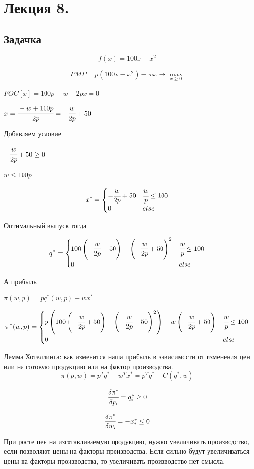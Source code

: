 \documentclass[reqno]{article}
\theoremstyle{definition}
\theoremstyle{definition}
\theoremstyle{definition}
\theoremstyle{definition}
\theoremstyle{definition}
\theoremstyle{definition}
\theoremstyle{definition}
\theoremstyle{definition}
\theoremstyle{definition}
\begin{document}
	\newpage
	
	\section{Лекция 8.}
	
	\subsection{Задачка}
	$$f(x) = 100 x - x^2$$
	
	$$PMP = p(100 x - x^2) - w x \rightarrow \max\limits_{x\geq 0} $$
	
	$FOC[x] = 100p - w - 2 px=0$
	
	$x = \cfrac{-w+100p}{2p} = -\cfrac{w}{2p}+50$
	
	Добавляем условие
	
	$-\cfrac{w}{2p}+50 \geq 0$
	
	$w \leq 100p$
	
	$$
	x^* = 
	\begin{cases}
		-\cfrac{w}{2p}+50 & \cfrac{w}{p} \leq 100 \\
		0 & else
	\end{cases}
	$$
	
	Оптимальный выпуск тогда
	
	$$
	q^* = 
	\begin{cases}
		100\left(-\cfrac{w}{2p}+50\right) - \left(-\cfrac{w}{2p}+50\right)^2 & \cfrac{w}{p} \leq 100 \\
		0 & else
	\end{cases}
	$$
	
	А прибыль
	
	$\pi (w,p)=pq^*(w,p)-wx^*$
	
	$$
	\pi^* (w,p) = 
	\begin{cases}
		p\left(100\left(-\cfrac{w}{2p}+50\right) - \left(-\cfrac{w}{2p}+50\right)^2\right)- w\left(-\cfrac{w}{2p}+50\right) & \cfrac{w}{p} \leq 100 \\
		0 & else
	\end{cases}
	$$
	
	Лемма Хотеллинга: как изменится наша прибыль в зависимости от изменения цен или на готовую продукцию или на фактор производства.
	$$\pi (p,w)=p^Tq^*-w^Tx^* = p^Tq^*-C(q^*,w)$$
	
	$$\cfrac{\delta \pi^*}{\delta p_i} = q_i^* \geq 0$$
	
	$$\cfrac{\delta \pi^*}{\delta w_i} = - x_i^* \leq 0$$
	
	При росте цен на изготавливаемую продукцию, нужно увеличивать производство, если  позволяют цены на факторы производства. Если сильно будут увеличиваться цены на факторы производства, то увеличивать производство нет смысла.
	
\end{document}

